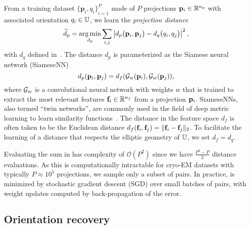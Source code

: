 From a training dataset ${\{ \mathbf{p}_{i}, q_i \}}_{i=1}^{P}$ made of $P$ projections $\mathbf{p}_i \in \mathbb{R}^{n_p}$ with associated orientation $q_i \in \mathbb{U}$, we learn the \textit{projection distance}
\begin{equation}
    \widehat{d}_p = \operatorname*{arg\,min}_{d_p} \sum_{i,j} \left| d_p\big(\mathbf{p}_{i},\mathbf{p}_{j}\big) - d_q\big(q_i,q_j\big) \right|^2,
    \label{eqn:distance-learning}
\end{equation}
with $d_q$ defined in~.
The distance $d_p$ is parameterized as the Siamese neural network (SiameseNN)~\cite{chopra2005learning}
\begin{equation}
    d_p(\mathbf{p}_i, \mathbf{p}_j) = d_f(\mathcal{G}_w(\mathbf{p}_i), \mathcal{G}_w(\mathbf{p}_j)),
    \label{eqn:distance:projections}
\end{equation}
where $\mathcal{G}_w$ is a convolutional neural network with weights $w$ that is trained to extract the most relevant features $\mathbf{f}_i \in \mathbb{R}^{n_f}$ from a projection $\mathbf{p}_i$. SiameseNNs, also termed ``twin networks'', are commonly used in the field of deep metric learning to learn similarity functions~\cite{yi2014deep}.
The distance in the feature space $d_f$ is often taken to be the Euclidean distance $d_f(\mathbf{f}_i, \mathbf{f}_j) = \Vert \mathbf{f}_i - \mathbf{f}_j \Vert_2$.
To facilitate the learning of a distance that respects the elliptic geometry of $\mathbb{U}$, we set $d_f = d_q$.

Evaluating the sum in  has complexity of $\mathcal{O}(P^2)$ since we have $\frac{P^2-P}{2}$ distance evaluations.
As this is computationally intractable for cryo-EM datasets with typically $P \approx 10^5$ projections, we sample only a subset of pairs.
In practice,  is minimized by stochastic gradient descent (SGD) over small batches of pairs, with weight updates computed by back-propagation of the error.


\subsection{Orientation recovery}\label{sec:method:orientation-recovery}

